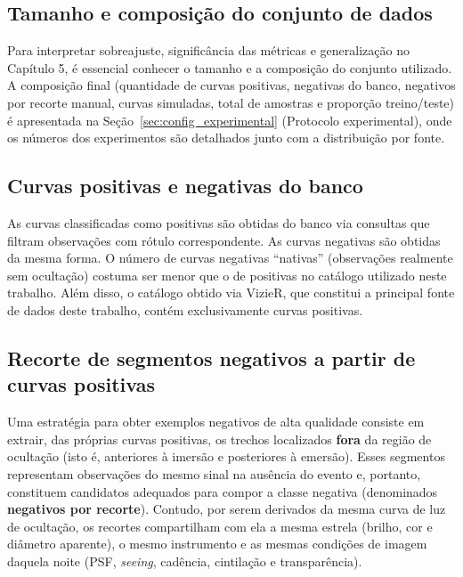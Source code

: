 \subsection{Tamanho e composição do conjunto de dados}

Para interpretar sobreajuste, significância das métricas e generalização no Capítulo 5, é essencial conhecer o tamanho e a composição do conjunto utilizado. A composição final (quantidade de curvas positivas, negativas do banco, negativos por recorte manual, curvas simuladas, total de amostras e proporção treino/teste) é apresentada na Seção~\ref{sec:config_experimental} (Protocolo experimental), onde os números dos experimentos são detalhados junto com a distribuição por fonte.

\subsection{Curvas positivas e negativas do banco}

As curvas classificadas como positivas são obtidas do banco via consultas que filtram observações com rótulo correspondente. As curvas negativas são obtidas da mesma forma. O número de curvas negativas ``nativas'' (observações realmente sem ocultação) costuma ser menor que o de positivas no catálogo utilizado neste trabalho. Além disso, o catálogo obtido via VizieR, que constitui a principal fonte de dados deste trabalho, contém exclusivamente curvas positivas.

\subsection{Recorte de segmentos negativos a partir de curvas positivas}

Uma estratégia para obter exemplos negativos de alta qualidade consiste em extrair, das próprias curvas positivas, os trechos localizados \textbf{fora} da região de ocultação (isto é, anteriores à imersão e posteriores à emersão). Esses segmentos representam observações do mesmo sinal na ausência do evento e, portanto, constituem candidatos adequados para compor a classe negativa (denominados \textbf{negativos por recorte}). Contudo, por serem derivados da mesma curva de luz de ocultação, os recortes compartilham com ela a mesma estrela (brilho, cor e diâmetro aparente), o mesmo instrumento e as mesmas condições de imagem daquela noite (PSF, \textit{seeing}, cadência, cintilação e transparência).


